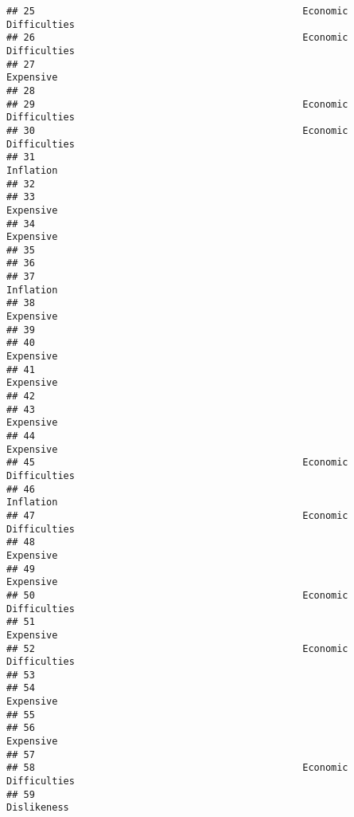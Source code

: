 \documentclass[
]{article}
\begin{document}
\begin{verbatim}
## 25                                               Economic Difficulties 
## 26                                               Economic Difficulties 
## 27                                                           Expensive 
## 28                                                                     
## 29                                               Economic Difficulties 
## 30                                               Economic Difficulties 
## 31                                                           Inflation 
## 32                                                                     
## 33                                                           Expensive 
## 34                                                           Expensive 
## 35                                                                     
## 36                                                                     
## 37                                                           Inflation 
## 38                                                           Expensive 
## 39                                                                     
## 40                                                           Expensive 
## 41                                                           Expensive 
## 42                                                                     
## 43                                                           Expensive 
## 44                                                           Expensive 
## 45                                               Economic Difficulties 
## 46                                                           Inflation 
## 47                                               Economic Difficulties 
## 48                                                           Expensive 
## 49                                                           Expensive 
## 50                                               Economic Difficulties 
## 51                                                           Expensive 
## 52                                               Economic Difficulties 
## 53                                                                     
## 54                                                           Expensive 
## 55                                                                     
## 56                                                           Expensive 
## 57                                                                     
## 58                                               Economic Difficulties 
## 59                                                         Dislikeness 

\end{verbatim}
\end{document}

